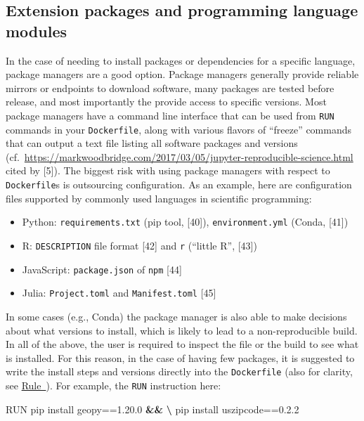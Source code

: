 \documentclass[10pt,letterpaper]{article}
\newenvironment{Shaded}{\begin{snugshade}}{\end{snugshade}}
\newcommand{\ExtensionTok}[1]{#1}
\newcommand{\KeywordTok}[1]{\textcolor[rgb]{0.13,0.29,0.53}{\textbf{#1}}}
\newcommand{\NormalTok}[1]{#1}
\providecommand{\tightlist}{%
  \setlength{\itemsep}{0pt}\setlength{\parskip}{0pt}}
\begin{document}
\hypertarget{extension-packages-and-programming-language-modules}{%
\subsection{Extension packages and programming language
modules}\label{extension-packages-and-programming-language-modules}}

In the case of needing to install packages or dependencies for a
specific language, package managers are a good option. Package managers
generally provide reliable mirrors or endpoints to download software,
many packages are tested before release, and most importantly the
provide access to specific versions. Most package managers have a
command line interface that can be used from \texttt{RUN} commands in
your \texttt{Dockerfile}, along with various flavors of ``freeze''
commands that can output a text file listing all software packages and
versions
(cf.~\url{https://markwoodbridge.com/2017/03/05/jupyter-reproducible-science.html}
cited by {[}5{]}). The biggest risk with using package managers with
respect to \texttt{Dockerfile}s is outsourcing configuration. As an
example, here are configuration files supported by commonly used
languages in scientific programming:

\begin{itemize}
\tightlist
\item
  Python: \texttt{requirements.txt} (pip tool, {[}40{]}),
  \texttt{environment.yml} (Conda, {[}41{]})
\item
  R: \texttt{DESCRIPTION} file format {[}42{]} and \texttt{r} (``little
  R'', {[}43{]})
\item
  JavaScript: \texttt{package.json} of \texttt{npm} {[}44{]}
\item
  Julia: \texttt{Project.toml} and \texttt{Manifest.toml} {[}45{]}
\end{itemize}

In some cases (e.g., Conda) the package manager is also able to make
decisions about what versions to install, which is likely to lead to a
non-reproducible build. In all of the above, the user is required to
inspect the file or the build to see what is installed. For this reason,
in the case of having few packages, it is suggested to write the install
steps and versions directly into the \texttt{Dockerfile} (also for
clarity, see \hyperref[{rule:clarity}]{Rule~}).
For example, the \texttt{RUN} instruction here:

\begin{Shaded}
\begin{Highlighting}[]
\ExtensionTok{RUN}\NormalTok{ pip install geopy==1.20.0 }\KeywordTok{&&} \KeywordTok{\textbackslash{}}
    \ExtensionTok{pip}\NormalTok{ install uszipcode==0.2.2}
\end{Highlighting}
\end{Shaded}
\end{document}
